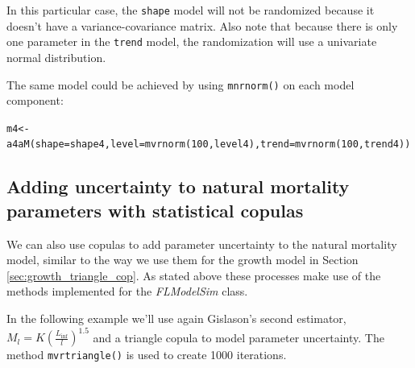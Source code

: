 \documentclass[a4paper,english,10pt]{article}\usepackage[]{graphicx}\usepackage[]{color}
\makeatletter
\newcommand{\hlnum}[1]{\textcolor[rgb]{0.2,0.2,0.2}{#1}}%
\newcommand{\hlstd}[1]{\textcolor[rgb]{0,0,0}{#1}}%
\newcommand{\hlkwb}[1]{\textcolor[rgb]{0.361,0.506,0.596}{#1}}%
\newcommand{\hlkwc}[1]{\textcolor[rgb]{0.361,0.506,0.596}{#1}}%
\newcommand{\hlkwd}[1]{\textcolor[rgb]{0.361,0.506,0.596}{#1}}%
\newenvironment{kframe}{%
 \def\at@end@of@kframe{}%
 \ifinner\ifhmode%
  \def\at@end@of@kframe{\end{minipage}}%
  \begin{minipage}{\columnwidth}%
 \fi\fi%
 \def\FrameCommand##1{\hskip\@totalleftmargin \hskip-\fboxsep
 \colorbox{shadecolor}{##1}\hskip-\fboxsep
     \hskip-\linewidth \hskip-\@totalleftmargin \hskip\columnwidth}%
 \MakeFramed {\advance\hsize-\width
   \@totalleftmargin\z@ \linewidth\hsize
   \@setminipage}}%
 {\par\unskip\endMakeFramed%
 \at@end@of@kframe}
\newenvironment{knitrout}{}{} %
\newcommand{\code}[1]{{\texttt{#1}}}
\newcommand{\class}[1]{{\textit{#1}}}
\makeatother
\begin{document}
In this particular case, the \code{shape} model will not be randomized because it doesn't have a variance-covariance matrix. Also note that because there is only one parameter in the \code{trend} model, the randomization will use a univariate normal distribution.

The same model could be achieved by using \code{mnrnorm()} on each model component:

\begin{knitrout}
\color{fgcolor}\begin{kframe}
\begin{alltt}
\hlstd{m4} \hlkwb{<-} \hlkwd{a4aM}\hlstd{(}\hlkwc{shape}\hlstd{=shape4,} \hlkwc{level}\hlstd{=}\hlkwd{mvrnorm}\hlstd{(}\hlnum{100}\hlstd{, level4),} \hlkwc{trend}\hlstd{=}\hlkwd{mvrnorm}\hlstd{(}\hlnum{100}\hlstd{, trend4))}
\end{alltt}
\end{kframe}
\end{knitrout}


\subsection{Adding uncertainty to natural mortality parameters with statistical copulas}

We can also use copulas to add parameter uncertainty to the natural mortality model, similar to the way we use them for the growth model in Section \ref{sec:growth_triangle_cop}. As stated above these processes make use of the methods implemented for the \class{FLModelSim} class.


In the following example we'll use again Gislason's second estimator, $M_l=K(\frac{L_{\inf}}{l})^{1.5}$ and a triangle copula to model parameter uncertainty. The method \code{mvrtriangle()} is used to create 1000 iterations.
\end{document}
